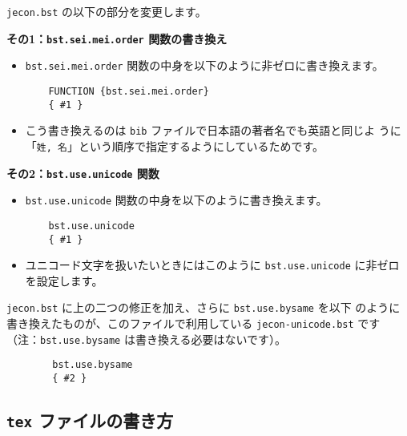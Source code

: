 \documentclass[a4paper,10pt]{bxjsarticle}
\begin{document}
\texttt{jecon.bst} の以下の部分を変更します。
\vspace*{1em}

\textbf{その1：\texttt{bst.sei.mei.order} 関数の書き換え}

\begin{itemize}
 \item \texttt{bst.sei.mei.order} 関数の中身を以下のように非ゼロに書き換えます。
\begin{verbatim}
    FUNCTION {bst.sei.mei.order}
    { #1 }
\end{verbatim}
 \item こう書き換えるのは \texttt{bib} ファイルで日本語の著者名でも英語と同じよ
       うに「\verb|姓, 名|」という順序で指定するようにしているためです。
\end{itemize}
\vspace*{1em}

\textbf{その2：\texttt{bst.use.unicode} 関数}
\begin{itemize}
 \item \texttt{bst.use.unicode} 関数の中身を以下のように書き換えます。
\begin{verbatim}
    bst.use.unicode
    { #1 }
\end{verbatim}
 \item ユニコード文字を扱いたいときにはこのように
       \texttt{bst.use.unicode} に非ゼロを設定します。
\end{itemize}
\vspace*{1em}

\texttt{jecon.bst} に上の二つの修正を加え、さらに \texttt{bst.use.bysame} を以下
のように書き換えたものが、このファイルで利用している \texttt{jecon-unicode.bst}
です（注：\texttt{bst.use.bysame} は書き換える必要はないです）。
\begin{verbatim}
        bst.use.bysame
        { #2 }
\end{verbatim}

\subsection{\texttt{tex} ファイルの書き方}
\end{document}
